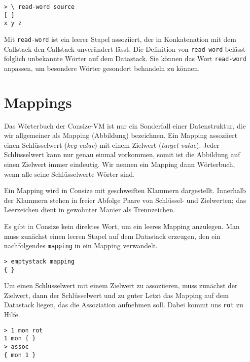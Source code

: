 \begin{verbatim}
> \ read-word source
[ ]
x y z
\end{verbatim}

Mit \verb|read-word| ist ein leerer Stapel assoziiert, der in Konkatenation mit dem Callstack den Callstack unverändert lässt. Die Definition von \verb|read-word| belässt folglich unbekannte Wörter auf dem Datastack. Sie können das Wort \verb|read-word| anpassen, um besondere Wörter gesondert behandeln zu können.

\section{Mappings}

Das Wörterbuch der Consize-VM ist nur ein Sonderfall einer Datenstruktur, die wir allgemeiner als Mapping (Abbildung) bezeichnen.
Ein Mapping assoziiert einen Schlüsselwert (\emph{key value}) mit einem Zielwert (\emph{target value}).
Jeder Schlüsselwert kann nur genau einmal vorkommen, somit ist die Abbildung auf einen Zielwert immer eindeutig.
Wir nennen ein Mapping dann Wörterbuch, wenn alle seine Schlüsselwerte Wörter sind.

Ein Mapping wird in Consize mit geschweiften Klammern dargestellt. Innerhalb der Klammern stehen in freier Abfolge Paare von Schlüssel- und Zielwerten; das Leerzeichen dient in gewohnter Manier als Trennzeichen.

Es gibt in Consize kein direktes Wort, um ein leeres Mapping anzulegen. Man muss zunächst einen leeren Stapel auf dem Datastack erzeugen, den ein nachfolgendes \verb|mapping| in ein Mapping verwandelt.

\begin{verbatim}
> emptystack mapping
{ }
\end{verbatim}

Um einen Schlüsselwert mit einem Zielwert zu assoziieren, muss zunächst der Zielwert, dann der Schlüsselwert und zu guter Letzt das Mapping auf dem Datastack liegen, das die Assoziation aufnehmen soll. Dabei kommt uns \verb|rot| zu Hilfe.

\begin{verbatim}
> 1 mon rot
1 mon { }
> assoc
{ mon 1 }
\end{verbatim}

